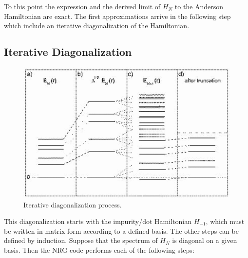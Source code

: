 To this point the expression  and the derived limit of $H_N$ to the Anderson Hamiltonian are exact. The first approximations arrive in the following step which include an iterative diagonalization of the Hamiltonian.
 
 \subsection{Iterative Diagonalization \label{subsec:IterativeDiag}}

\begin{figure}[bt]
\centering
\includegraphics[scale=0.5]{IMAGES/DQD/cutting.png}
\caption{ \label{fig:IterativeDiagonalization} Iterative diagonalization process. \protect{} }
\end{figure}


 This diagonalization starts with the impurity/dot Hamiltonian $H_{-1}$, which must be written in matrix form according to a defined basis. The other steps can be defined by induction.  Suppose that the spectrum of $H_{N}$ is diagonal on a given basis. Then the NRG code performs each of the following steps:

